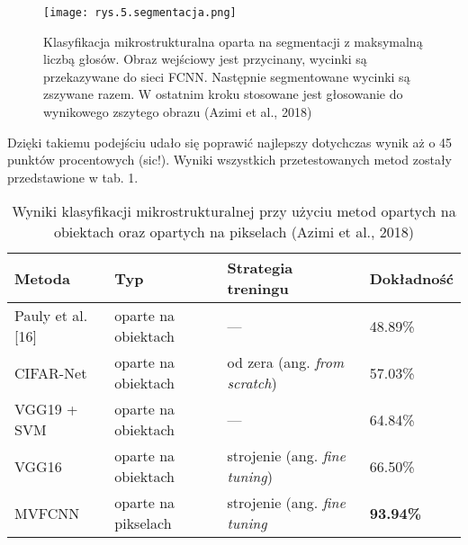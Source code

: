 \begin{figure}[h]
    \centering
    \texttt{[image: rys.5.segmentacja.png]}
    \caption{Klasyfikacja mikrostrukturalna oparta na segmentacji z maksymalną liczbą głosów. Obraz wejściowy jest przycinany, wycinki są przekazywane do sieci FCNN. Następnie 	segmentowane wycinki są zszywane razem. W ostatnim kroku stosowane jest głosowanie do wynikowego zszytego obrazu (Azimi et al., 2018)}
    \label{fig:mesh5}
\end{figure}

Dzięki takiemu podejściu udało się poprawić najlepszy dotychczas wynik aż o 45 punktów procentowych (sic!). Wyniki wszystkich przetestowanych metod zostały przedstawione w tab. 1.

\begin{table}[h]
	\centering
	
	\begin{threeparttable}
		\caption{Wyniki klasyfikacji mikrostrukturalnej przy użyciu metod opartych na obiektach oraz opartych na pikselach (Azimi et al., 2018)}
		\label{tab:tab1}
		
		\begin{tabularx}{1\textwidth}{ |X|X|X|X| }
  \hline
   \textbf{Metoda} & \textbf{Typ} & \textbf{Strategia treningu} & \textbf{Dokładność}\\
  \hline
  Pauly et al. [16] & oparte na obiektach & — & 48.89\%\\
  \hline
  CIFAR-Net & oparte na obiektach & od zera (ang. \textit{from scratch}) & 57.03\%\\
  \hline
  VGG19 + SVM & oparte na obiektach & — & 64.84\%\\
  \hline
  VGG16 & oparte na obiektach & strojenie (ang. \textit{fine tuning}) & 66.50\%\\
  \hline
  MVFCNN & oparte na pikselach & strojenie (ang. \textit{fine tuning} & \textbf{93.94\%}\\
  \hline
\end{tabularx}
		
		
	\end{threeparttable}
\end{table}

